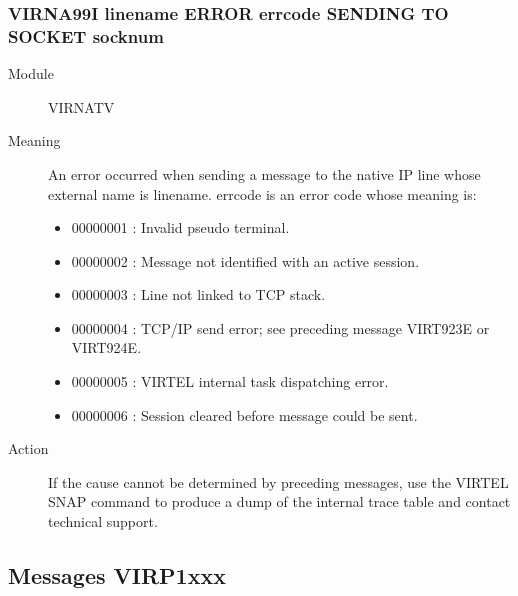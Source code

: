 \documentclass[letterpaper,10pt,english]{sphinxmanual}
\begin{document}
\subsubsection{VIRNA99I linename ERROR errcode SENDING TO SOCKET socknum}
\label{\detokenize{messages:virna99i-linename-error-errcode-sending-to-socket-socknum}}\begin{description}
\item[{Module}] \leavevmode
VIRNATV

\item[{Meaning}] \leavevmode
An error occurred when sending a message to the native IP line whose external name is linename. errcode is an error code whose meaning is:
\begin{itemize}
\item {} 
00000001 : Invalid pseudo terminal.

\item {} 
00000002 : Message not identified with an active session.

\item {} 
00000003 : Line not linked to TCP stack.

\item {} 
00000004 : TCP/IP send error; see preceding message VIRT923E or VIRT924E.

\item {} 
00000005 : VIRTEL internal task dispatching error.

\item {} 
00000006 : Session cleared before message could be sent.

\end{itemize}

\item[{Action}] \leavevmode
If the cause cannot be determined by preceding messages, use the VIRTEL SNAP command to produce a dump of the internal trace table and contact technical support.

\end{description}


\subsection{Messages VIRP1xxx}
\label{\detokenize{messages:messages-virp1xxx}}
\end{document}
